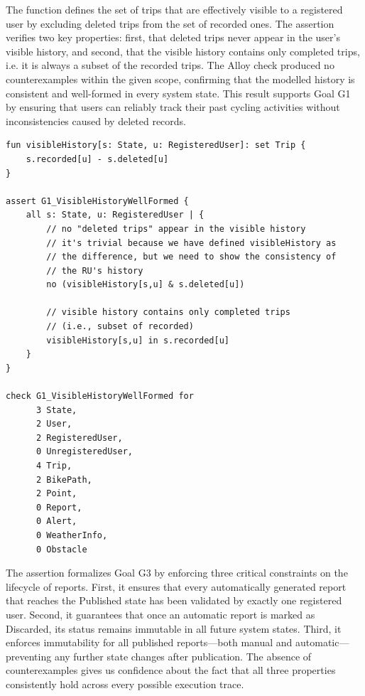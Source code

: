 The function  defines the set of trips that are effectively visible to a registered user by excluding deleted trips from the set of recorded ones. The assertion \newline {} verifies two key properties: first, that deleted trips never appear in the user’s visible history, and second, that the visible history contains only completed trips, i.e. it is always a subset of the recorded trips. The Alloy check produced no counterexamples within the given scope, confirming that the modelled history is consistent and well-formed in every system state. This result supports Goal G1 by ensuring that users can reliably track their past cycling activities without inconsistencies caused by deleted records.

\begin{lstlisting}[caption=Assertion for Goal G1.]
fun visibleHistory[s: State, u: RegisteredUser]: set Trip {
    s.recorded[u] - s.deleted[u]
}

assert G1_VisibleHistoryWellFormed {
    all s: State, u: RegisteredUser | {
        // no "deleted trips" appear in the visible history
        // it's trivial because we have defined visibleHistory as 
        // the difference, but we need to show the consistency of 
        // the RU's history
        no (visibleHistory[s,u] & s.deleted[u])		

        // visible history contains only completed trips 
        // (i.e., subset of recorded)
        visibleHistory[s,u] in s.recorded[u]
    }
}

check G1_VisibleHistoryWellFormed for
      3 State,
      2 User,
      2 RegisteredUser,
      0 UnregisteredUser,
      4 Trip,
      2 BikePath,
      2 Point,
      0 Report,
      0 Alert,
      0 WeatherInfo,
      0 Obstacle
\end{lstlisting}

The assertion  formalizes Goal G3 by enforcing three critical constraints on the lifecycle of reports. First, it ensures that every automatically generated report that reaches the Published state has been validated by exactly one registered user. Second, it guarantees that once an automatic report is marked as Discarded, its status remains immutable in all future system states. Third, it enforces immutability for all published reports—both manual and automatic—preventing any further state changes after publication.
The absence of counterexamples gives us confidence about the fact that all three properties consistently hold across every possible execution trace. 

